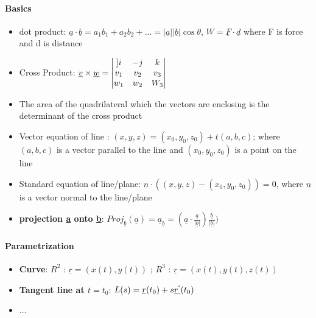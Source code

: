\documentclass[8pt, twocolumn]{article}
\begin{document}
\paragraph{Basics}
\begin{itemize}
	\item dot product: $\underline{a} \cdot \underline{b} = a_1 b_1 + a_2b_2 + ... = |\underline{a}| |\underline{b}| \cos{\theta} $, $W = \underline{F} \cdot \underline{d}$ where F is force and d is distance
	\item Cross Product: $\underline{v} \times \underline{w} = \begin{vmatrix} ]
																	i & -j & k \\ 
																	v_1 & v_2 & v_3 \\ 
																	w_1 & w_2 & W_3 \notag
																\end{vmatrix}$ 
	\item The area of the quadrilateral which the vectors are enclosing is the determinant of the cross product
	\item Vector equation of line : $(x, y, z) = (x_0, y_0, z_0) + t (a, b, c)$; where $(a, b, c)$ is a vector parallel to the line and $(x_0, y_0, z_0)$ is a point on the line
	\item Standard equation of line/plane: $\underline{n} \cdot ((x, y, z) - (x_0, y_0, z_0)) = 0$, where $\underline{n}$ is a vector normal to the line/plane
	\item \textbf{projection \underline{a} onto \underline{b}}: $Proj_{\underline{b}}(\underline{a}) = {\underline{a}_{\underline{b}}} = (\underline{a} \cdot \frac{\underline{a}}{|\underline{b}|})\frac{\underline{b}}{|\underline{b}|})$
\end{itemize}

\paragraph{Parametrization}
\begin{itemize}
	\item \textbf{Curve}: $R^2$ : $\underline{r} = (x(t), y(t))$ ; $R^3$ : $\underline{r} = (x(t), y(t), z(t))$
	\item \textbf{Tangent line at $t = t_0$}: $L(s) = \underline{r}(t_0) + s\underline{r^`}(t_0)$
	\item ...
\end{itemize}
\end{document}
